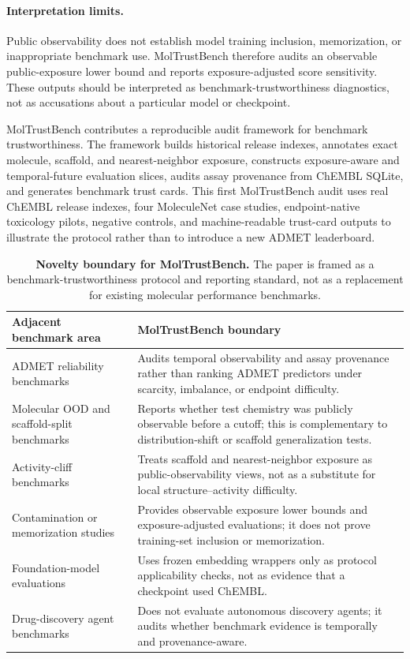 \documentclass[unnumsec,webpdf,contemporary,large,numbered]{oup-authoring-template}
\begin{document}
\paragraph{Interpretation limits.} Public observability does not establish model training inclusion, memorization, or inappropriate benchmark use. MolTrustBench therefore audits an observable public-exposure lower bound and reports exposure-adjusted score sensitivity. These outputs should be interpreted as benchmark-trustworthiness diagnostics, not as accusations about a particular model or checkpoint.

MolTrustBench contributes a reproducible audit framework for benchmark trustworthiness. The framework builds historical release indexes, annotates exact molecule, scaffold, and nearest-neighbor exposure, constructs exposure-aware and temporal-future evaluation slices, audits assay provenance from ChEMBL SQLite, and generates benchmark trust cards. This first MolTrustBench audit uses real ChEMBL release indexes, four MoleculeNet case studies, endpoint-native toxicology pilots, negative controls, and machine-readable trust-card outputs to illustrate the protocol rather than to introduce a new ADMET leaderboard.

\begin{table}[!t]
\centering
\caption{\textbf{Novelty boundary for MolTrustBench.} The paper is framed as a benchmark-trustworthiness protocol and reporting standard, not as a replacement for existing molecular performance benchmarks.}
\label{tab:novelty-boundary}
\small
\begin{tabular*}{\textwidth}{@{\extracolsep{\fill}}p{}p{}}
\toprule
Adjacent benchmark area & MolTrustBench boundary \\
\midrule
ADMET reliability benchmarks & Audits temporal observability and assay provenance rather than ranking ADMET predictors under scarcity, imbalance, or endpoint difficulty. \\
Molecular OOD and scaffold-split benchmarks & Reports whether test chemistry was publicly observable before a cutoff; this is complementary to distribution-shift or scaffold generalization tests. \\
Activity-cliff benchmarks & Treats scaffold and nearest-neighbor exposure as public-observability views, not as a substitute for local structure--activity difficulty. \\
Contamination or memorization studies & Provides observable exposure lower bounds and exposure-adjusted evaluations; it does not prove training-set inclusion or memorization. \\
Foundation-model evaluations & Uses frozen embedding wrappers only as protocol applicability checks, not as evidence that a checkpoint used ChEMBL. \\
Drug-discovery agent benchmarks & Does not evaluate autonomous discovery agents; it audits whether benchmark evidence is temporally and provenance-aware. \\
\bottomrule
\end{tabular*}
\end{table}
\end{document}
